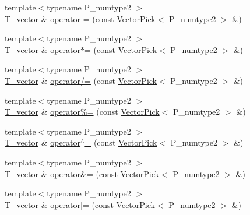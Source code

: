 \begin{DoxyCompactItemize}
\item 
{\footnotesize template$<$typename P\+\_\+numtype2 $>$ }\\\hyperlink{classVector_a29e279edfeac4d65aad0d814c05cfaf0}{T\+\_\+vector} \& \hyperlink{classVector_aab12643660273daef60bffab833279cf}{operator-\/=} (const \hyperlink{classVectorPick}{Vector\+Pick}$<$ P\+\_\+numtype2 $>$ \&)
\item 
{\footnotesize template$<$typename P\+\_\+numtype2 $>$ }\\\hyperlink{classVector_a29e279edfeac4d65aad0d814c05cfaf0}{T\+\_\+vector} \& \hyperlink{classVector_ad05ba6555078a18bfcc01a015fe65bc1}{operator$\ast$=} (const \hyperlink{classVectorPick}{Vector\+Pick}$<$ P\+\_\+numtype2 $>$ \&)
\item 
{\footnotesize template$<$typename P\+\_\+numtype2 $>$ }\\\hyperlink{classVector_a29e279edfeac4d65aad0d814c05cfaf0}{T\+\_\+vector} \& \hyperlink{classVector_af8cad2b7e1d24b5eb947aff9375acf32}{operator/=} (const \hyperlink{classVectorPick}{Vector\+Pick}$<$ P\+\_\+numtype2 $>$ \&)
\item 
{\footnotesize template$<$typename P\+\_\+numtype2 $>$ }\\\hyperlink{classVector_a29e279edfeac4d65aad0d814c05cfaf0}{T\+\_\+vector} \& \hyperlink{classVector_a382196db30d0860b6dacc32a11cfaf18}{operator\%=} (const \hyperlink{classVectorPick}{Vector\+Pick}$<$ P\+\_\+numtype2 $>$ \&)
\item 
{\footnotesize template$<$typename P\+\_\+numtype2 $>$ }\\\hyperlink{classVector_a29e279edfeac4d65aad0d814c05cfaf0}{T\+\_\+vector} \& \hyperlink{classVector_a4d95db8bd70459e793f8ad931f3e2283}{operator$^\wedge$=} (const \hyperlink{classVectorPick}{Vector\+Pick}$<$ P\+\_\+numtype2 $>$ \&)
\item 
{\footnotesize template$<$typename P\+\_\+numtype2 $>$ }\\\hyperlink{classVector_a29e279edfeac4d65aad0d814c05cfaf0}{T\+\_\+vector} \& \hyperlink{classVector_a6f3144c7922815595470fc47c54e3a3e}{operator\&=} (const \hyperlink{classVectorPick}{Vector\+Pick}$<$ P\+\_\+numtype2 $>$ \&)
\item 
{\footnotesize template$<$typename P\+\_\+numtype2 $>$ }\\\hyperlink{classVector_a29e279edfeac4d65aad0d814c05cfaf0}{T\+\_\+vector} \& \hyperlink{classVector_a168473a9c914f380f7947ae8d5b4d2c2}{operator$\vert$=} (const \hyperlink{classVectorPick}{Vector\+Pick}$<$ P\+\_\+numtype2 $>$ \&)
\item 

\end{DoxyCompactItemize}
